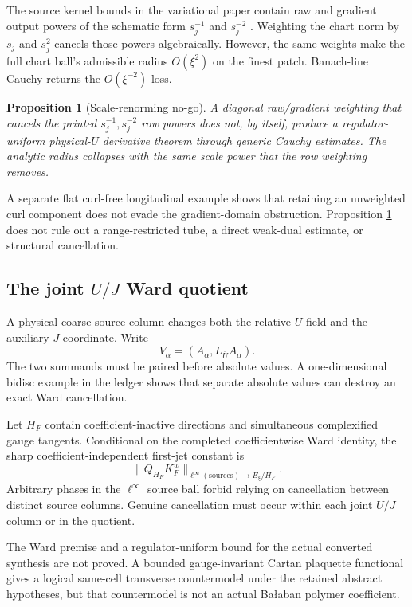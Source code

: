 \documentclass[11pt]{article}
\newtheorem{proposition}[theorem]{Proposition}
\theoremstyle{definition}
\begin{document}
The source kernel bounds in the variational paper contain raw and gradient
output powers of the schematic form \(s_j^{-1}\) and \(s_j^{-2}\)
\cite{balaban1985variational}.  Weighting the chart norm by \(s_j\) and
\(s_j^2\) cancels those powers algebraically.  However, the same weights
make the full chart ball's admissible radius \(O(\xi^2)\) on the finest
patch.  Banach-line Cauchy returns the \(O(\xi^{-2})\) loss.

\begin{proposition}[Scale-renorming no-go]
\label{prop:renorm-no-go}
A diagonal raw/gradient weighting that cancels the printed
\(s_j^{-1},s_j^{-2}\) row powers does not, by itself, produce a
regulator-uniform physical-\(U\) derivative theorem through generic Cauchy
estimates.  The analytic radius collapses with the same scale power that
the row weighting removes.
\end{proposition}

A separate flat curl-free longitudinal example shows that retaining an
unweighted curl component does not evade the gradient-domain obstruction.
Proposition \ref{prop:renorm-no-go} does not rule out a range-restricted
tube, a direct weak-dual estimate, or structural cancellation.

\subsection{The joint \(U/J\) Ward quotient}

A physical coarse-source column changes both the relative \(U\) field and
the auxiliary \(J\) coordinate.  Write
\[
V_\alpha=(A_\alpha,L_{\bar U}A_\alpha).
\tag{5.1}
\]
The two summands must be paired before absolute values.  A one-dimensional
bidisc example in the ledger shows that separate absolute values can destroy
an exact Ward cancellation.

Let \(H_F\) contain coefficient-inactive directions and simultaneous
complexified gauge tangents.  Conditional on the completed coefficientwise
Ward identity, the sharp coefficient-independent first-jet constant is
\[
\bigl\|Q_{H_F}K_F^w\bigr\|_{
  \ell^\infty(\text{sources})\to E_\xi/H_F}.
\tag{5.2}
\]
Arbitrary phases in the \(\ell^\infty\) source ball forbid relying on
cancellation between distinct source columns.  Genuine cancellation must
occur within each joint \(U/J\) column or in the quotient.

The Ward premise and a regulator-uniform bound for the actual converted
synthesis are not proved.  A bounded gauge-invariant Cartan plaquette
functional gives a logical same-cell transverse countermodel under the
retained abstract hypotheses, but that countermodel is not an actual
Ba{\l}aban polymer coefficient.
\end{document}

